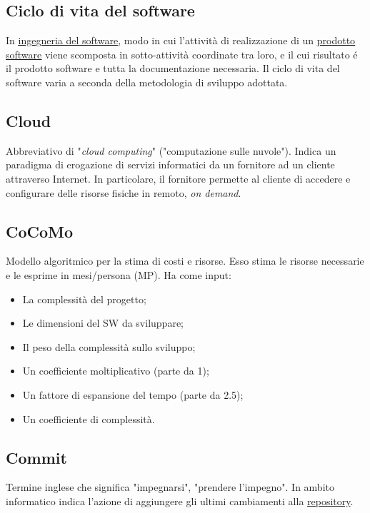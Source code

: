 	\subsection{Ciclo di vita del software}
	\label{sec:ciclodivita}
	In \underline{\hyperref[sec:swe]{ingegneria del software}}, modo in cui l'attività di realizzazione di un \underline{\hyperref[sec:prodottosoftware]{prodotto software}} viene scomposta in sotto-attività coordinate tra loro, e il cui risultato é il prodotto software e tutta la documentazione necessaria. Il ciclo di vita del software varia a seconda della metodologia di sviluppo adottata.


	\subsection{Cloud}
	\label{sec:cloud}
	Abbreviativo di "\emph{cloud computing}" ("computazione sulle nuvole"). Indica un paradigma di erogazione di servizi informatici da un fornitore ad un cliente attraverso Internet. In particolare, il fornitore permette al cliente di accedere e configurare delle risorse fisiche in remoto, \emph{on demand}.

	\subsection{CoCoMo}
	\label{sec:cocomo}
	Modello algoritmico per la stima di costi e risorse. Esso stima le risorse necessarie e le esprime in mesi/persona (MP). Ha come input:
	\begin{itemize}
	\item La complessità del progetto;
	\item Le dimensioni del SW da sviluppare;
	\item Il peso della complessità sullo sviluppo;
	\item Un coefficiente moltiplicativo (parte da 1);
	\item Un fattore di espansione del tempo (parte da 2.5);
	\item Un coefficiente di complessità.
	\end{itemize}

	\subsection{Commit}
	\label{sec:commit}
    Termine inglese che significa "impegnarsi", "prendere l'impegno". In ambito informatico indica l'azione di aggiungere gli ultimi cambiamenti alla \underline{\hyperref[sec:repo]repository{}}.

